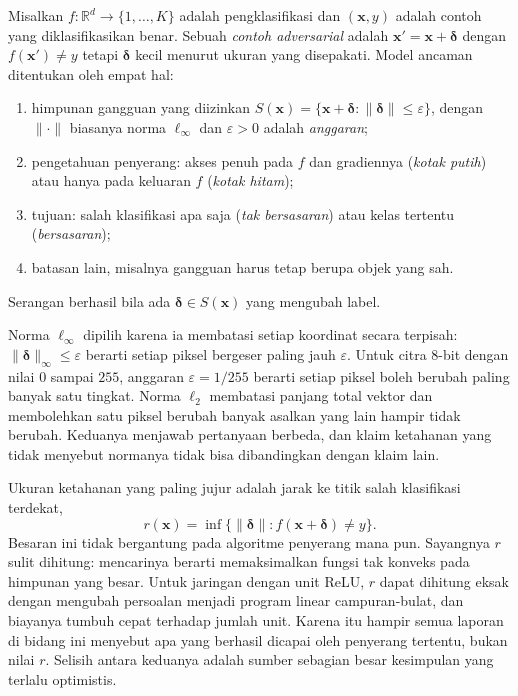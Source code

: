 \begin{definisi}
Misalkan $f:\mathbb{R}^{d}\to\{1,\dots,K\}$ adalah pengklasifikasi dan
$(\mathbf{x},y)$ adalah contoh yang diklasifikasikan benar. Sebuah
\emph{contoh adversarial} adalah $\mathbf{x}'=\mathbf{x}+\boldsymbol{\delta}$ dengan
$f(\mathbf{x}')\neq y$ tetapi $\boldsymbol{\delta}$ kecil menurut ukuran yang
disepakati. Model ancaman ditentukan oleh empat hal:
\begin{enumerate}
  \item himpunan gangguan yang diizinkan
        $S(\mathbf{x})=\{\mathbf{x}+\boldsymbol{\delta}:
        \lVert\boldsymbol{\delta}\rVert\le\varepsilon\}$, dengan
        $\lVert\cdot\rVert$ biasanya norma $\ell_\infty$ dan $\varepsilon>0$
        adalah \emph{anggaran};
  \item pengetahuan penyerang: akses penuh pada $f$ dan gradiennya
        (\emph{kotak putih}) atau hanya pada keluaran $f$ (\emph{kotak hitam});
  \item tujuan: salah klasifikasi apa saja (\emph{tak bersasaran}) atau kelas
        tertentu (\emph{bersasaran});
  \item batasan lain, misalnya gangguan harus tetap berupa objek yang sah.
\end{enumerate}
Serangan berhasil bila ada $\boldsymbol{\delta}\in S(\mathbf{x})$ yang mengubah label.
\end{definisi}

Norma $\ell_\infty$ dipilih karena ia membatasi setiap koordinat secara terpisah:
$\lVert\boldsymbol{\delta}\rVert_\infty\le\varepsilon$ berarti setiap piksel bergeser
paling jauh $\varepsilon$. Untuk citra 8-bit dengan nilai $0$ sampai $255$, anggaran
$\varepsilon=1/255$ berarti setiap piksel boleh berubah paling banyak satu tingkat.
Norma $\ell_2$ membatasi panjang total vektor dan membolehkan satu piksel berubah
banyak asalkan yang lain hampir tidak berubah. Keduanya menjawab pertanyaan berbeda,
dan klaim ketahanan yang tidak menyebut normanya tidak bisa dibandingkan dengan klaim
lain.

Ukuran ketahanan yang paling jujur adalah jarak ke titik salah klasifikasi terdekat,
\[
  r(\mathbf{x})=\inf\{\lVert\boldsymbol{\delta}\rVert:
  f(\mathbf{x}+\boldsymbol{\delta})\neq y\}.
\]
Besaran ini tidak bergantung pada algoritme penyerang mana pun. Sayangnya $r$ sulit
dihitung: mencarinya berarti memaksimalkan fungsi tak konveks pada himpunan yang
besar. Untuk jaringan dengan unit ReLU, $r$ dapat dihitung eksak dengan mengubah
persoalan menjadi program linear campuran-bulat, dan biayanya tumbuh cepat terhadap
jumlah unit. Karena itu hampir semua laporan di bidang ini menyebut apa yang berhasil
dicapai oleh penyerang tertentu, bukan nilai $r$. Selisih antara keduanya adalah
sumber sebagian besar kesimpulan yang terlalu optimistis.

